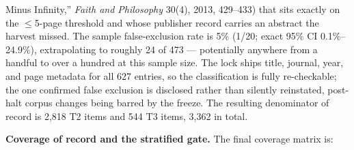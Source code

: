 Minus Infinity,'' \emph{Faith and Philosophy} 30(4), 2013, 429--433) that sits exactly on the $\le$5-page threshold and whose publisher record carries an abstract the harvest missed. The sample false-exclusion rate is 5\% (1/20; exact 95\% CI 0.1\%--24.9\%), extrapolating to roughly 24 of 473 --- potentially anywhere from a handful to over a hundred at this sample size. The lock ships title, journal, year, and page metadata for all 627 entries, so the classification is fully re-checkable; the one confirmed false exclusion is disclosed rather than silently reinstated, post-halt corpus changes being barred by the freeze. The resulting denominator of record is 2,818 T2 items and 544 T3 items, 3,362 in total.

\textbf{Coverage of record and the stratified gate.} The final coverage matrix is:

